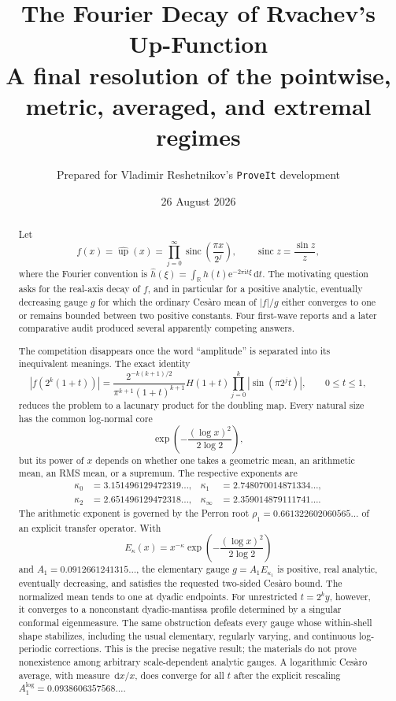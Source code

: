 \documentclass[11pt,oneside]{article}
\title{\bfseries The Fourier Decay of Rvachev's Up-Function\\[0.35em]
\large A final resolution of the pointwise, metric, averaged, and extremal regimes}
\author{Prepared for Vladimir Reshetnikov's \texttt{ProveIt} development}
\date{26 August 2026}
\theoremstyle{definition}
\theoremstyle{remark}
\newcommand{\R}{\mathbb R}
\newcommand{\e}{\mathrm e}
\newcommand{\ii}{\mathrm i}
\newcommand{\dd}{\,\mathrm d}
\newcommand{\Up}{\operatorname{up}}
\newcommand{\sinc}{\operatorname{sinc}}
\begin{document}
\maketitle

\begin{abstract}
Let
\[
 f(x)=\widehat{\Up}(x)
 =\prod_{j=0}^{\infty}\sinc\!\left(\frac{\pi x}{2^j}\right),
 \qquad \sinc z=\frac{\sin z}{z},
\]
where the Fourier convention is
$\widehat h(\xi)=\int_{\R}h(t)\e^{-2\pi\ii t\xi}\dd t$.
The motivating question asks for the real-axis decay of $f$, and in particular
for a positive analytic, eventually decreasing gauge $g$ for which the
ordinary Ces\`aro mean of $|f|/g$ either converges to one or remains bounded
between two positive constants.  Four first-wave reports and a later
comparative audit produced several apparently competing answers.

The competition disappears once the word ``amplitude'' is separated into its
inequivalent meanings.  The exact identity
\[
 |f(2^k(1+t))|
 =\frac{2^{-k(k+1)/2}}{\pi^{k+1}(1+t)^{k+1}}
 H(1+t)\prod_{j=0}^{k}|\sin(\pi2^jt)|,
 \qquad 0\le t\le1,
\]
reduces the problem to a lacunary product for the doubling map.  Every natural
size has the common log-normal core
\[
 \exp\!\left(-\frac{(\log x)^2}{2\log2}\right),
\]
but its power of $x$ depends on whether one takes a geometric mean, an
arithmetic mean, an RMS mean, or a supremum.  The respective exponents are
\[
\begin{aligned}
 \kappa_0&=3.151496129472319\ldots,
 &\kappa_1&=2.748070014871334\ldots,\\
 \kappa_2&=2.651496129472318\ldots,
 &\kappa_\infty&=2.359014879111741\ldots .
\end{aligned}
\]
The arithmetic exponent is governed by the Perron root
$\rho_1=0.661322602060565\ldots$ of an explicit transfer operator.  With
\[
 E_\kappa(x)=x^{-\kappa}
 \exp\!\left(-\frac{(\log x)^2}{2\log2}\right)
\]
and
$A_1=0.0912661241315\ldots$, the elementary gauge
$g=A_1E_{\kappa_1}$ is positive, real analytic, eventually decreasing, and
satisfies the requested two-sided Ces\`aro bound.  The normalized mean tends
to one at dyadic endpoints.  For unrestricted $t=2^ky$, however, it converges
to a nonconstant dyadic-mantissa profile determined by a singular conformal
eigenmeasure.  The same obstruction defeats every gauge whose within-shell
shape stabilizes, including the usual elementary, regularly varying, and
continuous log-periodic corrections.  This is the precise negative result;
the materials do not prove nonexistence among arbitrary scale-dependent
analytic gauges.  A logarithmic Ces\`aro average, with measure $\dd x/x$, does
converge for all $t$ after the explicit rescaling
$A_1^{\log}=0.0938606357568\ldots$.


\end{abstract}
\end{document}
